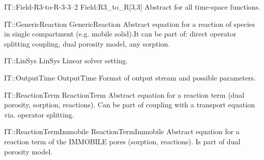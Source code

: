 \begin{AbstractType}
	{IT::Field-R3-to-R-3-3--2}
	{Field:R3{\_}to{\_}R[3,3]}
	{}
	{{{Abstract for all time-space functions.}}}
\end{AbstractType}
\begin{AbstractType}
	{IT::GenericReaction}
	{GenericReaction}
	{}
	{{{Abstract equation for a reaction of species in single compartment (e.g. mobile solid).It can be part of: direct operator splitting coupling, dual porosity model, any sorption.}}}
\end{AbstractType}
\begin{AbstractType}
	{IT::LinSys}
	{LinSys}
	{}
	{{{Linear solver setting.}}}
\end{AbstractType}
\begin{AbstractType}
	{IT::OutputTime}
	{OutputTime}
	{}
	{{{Format of output stream and possible parameters.}}}
\end{AbstractType}
\begin{AbstractType}
	{IT::ReactionTerm}
	{ReactionTerm}
	{}
	{{{Abstract equation for a reaction term (dual porosity, sorption, reactions). Can be part of coupling with a transport equation via. operator splitting.}}}
\end{AbstractType}
\begin{AbstractType}
	{IT::ReactionTermImmobile}
	{ReactionTermImmobile}
	{}
	{{{Abstract equation for a reaction term of the IMMOBILE pores (sorption, reactions). Is part of dual porosity model.}}}
\end{AbstractType}
